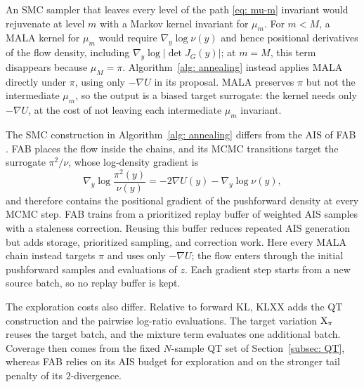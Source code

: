 \documentclass{article}
\begin{document}
\begin{algorithm}[htb]
	\caption{SMC for a biased target surrogate}
	\label{alg: annealing}
	
\end{algorithm}
\medskip
\noindent
An SMC sampler that leaves every level of the path \eqref{eq: mu-m} invariant would rejuvenate at level $m$ with a Markov kernel invariant for $\mu_m$. For $m<M$, a MALA kernel for $\mu_m$ would require $\nabla_y\log\nu(y)$ and hence positional derivatives of the flow density, including $\nabla_y\log|\det J_G(y)|$; at $m=M$, this term disappears because $\mu_M=\pi$. Algorithm~\ref{alg: annealing} instead applies MALA directly under $\pi$, using only $-\nabla U$ in its proposal. MALA preserves $\pi$ but not the intermediate $\mu_m$, so the output is a biased target surrogate: the kernel needs only $-\nabla U$, at the cost of not leaving each intermediate $\mu_m$ invariant.

The SMC construction in Algorithm~\ref{alg: annealing} differs from the AIS of FAB \citep{midgley2022flow}. FAB places the flow inside the chains, and its MCMC transitions target the surrogate $\pi^2/\nu$, whose log-density gradient is
\begin{equation*}
	\nabla_y \log \frac{\pi^2(y)}{\nu(y)} = -2\nabla U(y) - \nabla_y \log\nu(y),
\end{equation*}
and therefore contains the positional gradient of the pushforward density at every MCMC step. FAB trains from a prioritized replay buffer of weighted AIS samples with a staleness correction. Reusing this buffer reduces repeated AIS generation but adds storage, prioritized sampling, and correction work. Here every MALA chain instead targets $\pi$ and uses only $-\nabla U$; the flow enters through the initial pushforward samples and evaluations of $z$. Each gradient step starts from a new source batch, so no replay buffer is kept.

The exploration costs also differ. Relative to forward KL, KLXX adds the QT construction and the pairwise log-ratio evaluations. The target variation $\mathrm{X}_\pi$ reuses the target batch, and the mixture term evaluates one additional batch. Coverage then comes from the fixed $N$-sample QT set of Section~\ref{subsec: QT}, whereas FAB relies on its AIS budget for exploration and on the stronger tail penalty of its $2$-divergence.
\end{document}
